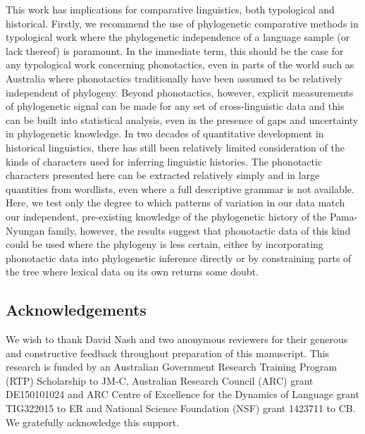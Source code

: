 This work has implications for comparative linguistics, both typological and historical. Firstly, we recommend the use of phylogenetic comparative methods in typological work where the phylogenetic independence of a language sample (or lack thereof) is paramount. In the immediate term, this should be the case for any typological work concerning phonotactics, even in parts of the world such as Australia where phonotactics traditionally have been assumed to be relatively independent of phylogeny. Beyond phonotactics, however, explicit measurements of phylogenetic signal can be made for any set of cross-linguistic data and this can be built into statistical analysis, even in the presence of gaps and uncertainty in phylogenetic knowledge. In two decades of quantitative development in historical linguistics, there has still been relatively limited consideration of the kinds of characters used for inferring linguistic histories. The phonotactic characters presented here can be extracted relatively simply and in large quantities from wordlists, even where a full descriptive grammar is not available. Here, we test only the degree to which patterns of variation in our data match our independent, pre-existing knowledge of the phylogenetic history of the Pama-Nyungan family, however, the results suggest that phonotactic data of this kind could be used where the phylogeny is less certain, either by incorporating phonotactic data into phylogenetic inference directly or by constraining parts of the tree where lexical data on its own returns some doubt.

\hypertarget{acknowledgements}{%
\subsection*{Acknowledgements}\label{acknowledgements}}

We wish to thank David Nash and two anonymous reviewers for their generous and constructive feedback throughout preparation of this manuscript. This research is funded by an Australian Government Research Training Program (RTP) Scholarship to JM-C, Australian Research Council (ARC) grant DE150101024 and ARC Centre of Excellence for the Dynamics of Language grant TIG322015 to ER and National Science Foundation (NSF) grant 1423711 to CB. We gratefully acknowledge this support.

